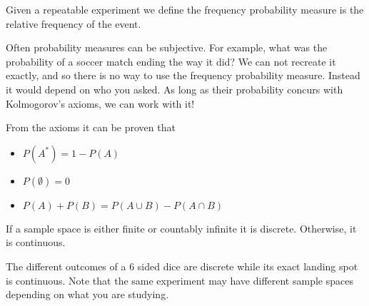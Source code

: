 \begin{example}
	Given a repeatable experiment we define the frequency probability measure is the relative frequency of the event.
\end{example}

\begin{example}
	Often probability measures can be subjective. For example, what was the probability of a soccer match ending the way it did? We can not recreate it exactly, and so there is no way to use the frequency probability measure. Instead it would depend on who you asked. As long as their probability concurs with Kolmogorov's axioms, we can work with it! 
\end{example}

\begin{corollary}
	From the axioms it can be proven that
	\begin{itemize}
		\item \(P(A^*) = 1 - P(A)\) 
		\item \(P(\emptyset ) = 0\)
		\item \(P(A) + P(B) = P(A \cup B) - P(A \cap B)\) 
	\end{itemize}
\end{corollary}

\begin{definition}
	If a sample space is either finite or countably infinite it is discrete. Otherwise, it is continuous.
\end{definition}

\begin{example}
	The different outcomes of a 6 sided dice are discrete while its exact landing spot is continuous. Note that the same experiment may have different sample spaces depending on what you are studying.
\end{example}
